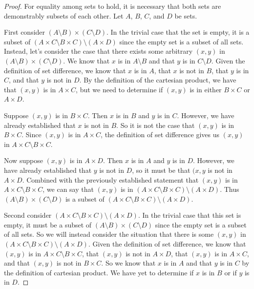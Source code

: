 \documentclass[main.tex]{subfiles}
\begin{document}
\begin{proof}
	For equality among sets to hold, it is necessary that both sets are
	demonstrably subsets of each other. Let \(A\), \(B\), \(C\), and \(D\)
	be sets.

	\medskip
	First consider \((A \setminus B) \times (C \setminus D)\). In the
	trivial case that the set is empty, it is a subset of
	\((A \times C \setminus B \times C) \setminus (A \times D)\) since the
	empty set is a subset of all sets. Instead, let's consider the case that
	there exists some arbitrary \((x,y)\) in
	\((A \setminus B) \times (C \setminus D)\). We know that \(x\) is in
	\(A \setminus B\) and that \(y\) is in \(C \setminus D\). Given the
	definition of set difference, we know that \(x\) is in \(A\), that \(x\)
	is not in \(B\), that \(y\) is in \(C\), and that \(y\) is not in \(D\).
	By the definition of the cartesian product, we have that \((x,y)\) is in
	\(A \times C\), but we need to determine if \((x,y)\) is in either
	\(B \times C\) or \(A \times D\).

	Suppose \((x,y)\) is in \(B \times C\). Then \(x\) is in \(B\) and \(y\)
	is in \(C\). However, we have already established that \(x\) is not in
	\(B\). So it is not the case that \((x,y)\) is in \(B \times C\). Since
	\((x,y)\) is in \(A \times C\), the definition of set difference gives
	us \((x,y)\) in \(A \times C \setminus B \times C\).

	Now suppose \((x,y)\) is in \(A \times D\). Then \(x\) is in \(A\) and
	\(y\) is in \(D\). However, we have already established that \(y\) is
	not in \(D\), so it must be that \((x,y\) is not in \(A \times D\).
	Combined with the previously established statement that \((x,y)\) is in
	\(A \times C \setminus B \times C\), we can say that \((x,y)\) is in
	\((A \times C \setminus B \times C) \setminus (A \times D)\). Thus
	\((A \setminus B) \times (C \setminus D)\) is a subset of
	\((A \times C \setminus B \times C) \setminus (A \times D)\).

	\medskip
	Second consider
	\((A \times C \setminus B \times C) \setminus (A \times D)\). In the
	trivial case that this set is empty, it must be a subset of
	\((A \setminus B) \times (C \setminus D)\) since the empty set is a
	subset of all sets. So we will instead consider the situation that there
	is some \((x,y)\) in
	\((A \times C \setminus B \times C) \setminus (A \times D)\). Given the
	definition of set difference, we know that \((x,y)\) is in
	\(A \times C \setminus B \times C\), that \((x,y)\) is not in
	\(A \times D\), that \((x,y)\) is in \(A \times C\), and that \((x,y)\)
	is not in \(B \times C\). So we know that \(x\) is in \(A\) and that
	\(y\) is in \(C\) by the definition of cartesian product. We have yet
	to determine if \(x\) is in \(B\) or if \(y\) is in \(D\).


\end{proof}
\end{document}
